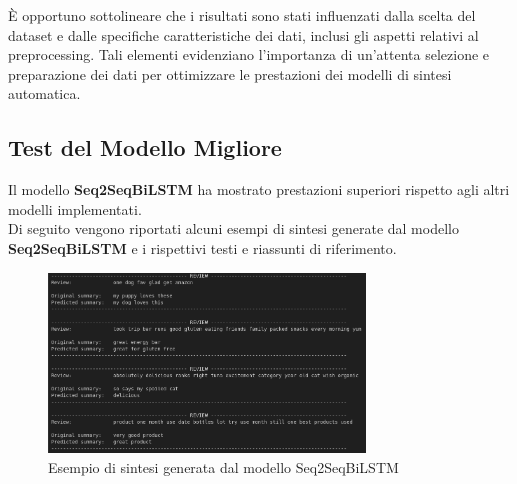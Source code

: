 È opportuno sottolineare che i risultati sono stati influenzati dalla scelta del dataset e dalle specifiche caratteristiche dei dati,
inclusi gli aspetti relativi al preprocessing. Tali elementi evidenziano l'importanza di un'attenta selezione e preparazione dei dati per
ottimizzare le prestazioni dei modelli di sintesi automatica.

\subsection{Test del Modello Migliore}
Il modello \textbf{Seq2SeqBiLSTM} ha mostrato prestazioni superiori rispetto agli altri modelli implementati.\\
Di seguito vengono riportati alcuni esempi di sintesi generate dal modello \textbf{Seq2SeqBiLSTM} e i rispettivi testi e riassunti di riferimento.\\

\begin{figure}[H]
    \centering
    \includegraphics[width=0.75\textwidth]{media/Seq2SeqBiLSTM_inference.png}
    \caption{Esempio di sintesi generata dal modello Seq2SeqBiLSTM}
    \label{fig:example1}
\end{figure}